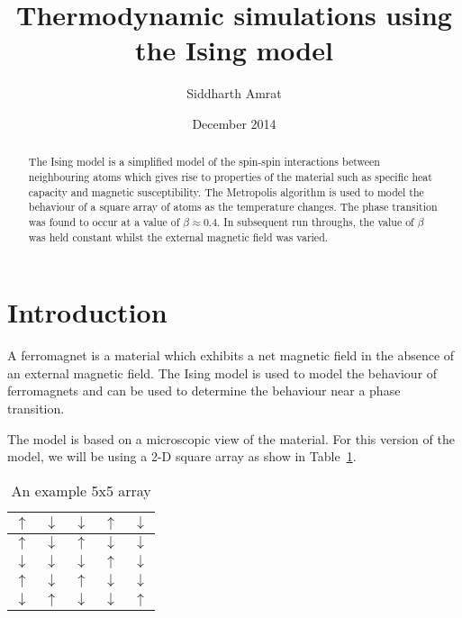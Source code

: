 \documentclass[11pt]{article}
\title{Thermodynamic simulations using the Ising model}
\author{Siddharth Amrat}
\date{December 2014}
\begin{document}
\maketitle

\begin{abstract}
The Ising model is a simplified model of the spin-spin interactions between neighbouring atoms which gives rise to properties of the material such as specific heat capacity and magnetic susceptibility. The Metropolis algorithm is used to model the behaviour of a square array of atoms as the temperature changes. The phase transition was found to occur at a value of $\beta \approx 0.4$. In subsequent run throughs, the value of $\beta$ was held constant whilst the external magnetic field was varied.
\end{abstract}

\section*{Introduction}
A ferromagnet is a material which exhibits a net magnetic field in the absence of an external magnetic field. The Ising model is used to model the behaviour of ferromagnets and can be used to determine the behaviour near a phase transition.

The model is based on a microscopic view of the material. For this version of the model, we will be using a 2-D square array as show in Table~\ref{isingarray}.

\begin{table}[h]
\centering
\begin{tabular}{|l|l|l|l|l|}
\hline
$\uparrow$ & $\downarrow$ & $\downarrow$ & $\uparrow$ & $\downarrow$ \\ \hline
$\uparrow$ & $\downarrow$ & $\uparrow$ & $\downarrow$ & $\downarrow$ \\ \hline
$\downarrow$ & $\downarrow$ & $\downarrow$ & $\uparrow$ & $\downarrow$ \\ \hline
$\uparrow$ & $\downarrow$ & $\uparrow$ & $\downarrow$ & $\downarrow$ \\ \hline
$\downarrow$ & $\uparrow$ & $\downarrow$ & $\downarrow$ & $\uparrow$ \\ \hline
\end{tabular}
\caption{An example 5x5 array}
\label{isingarray}
\end{table}
\end{document}
